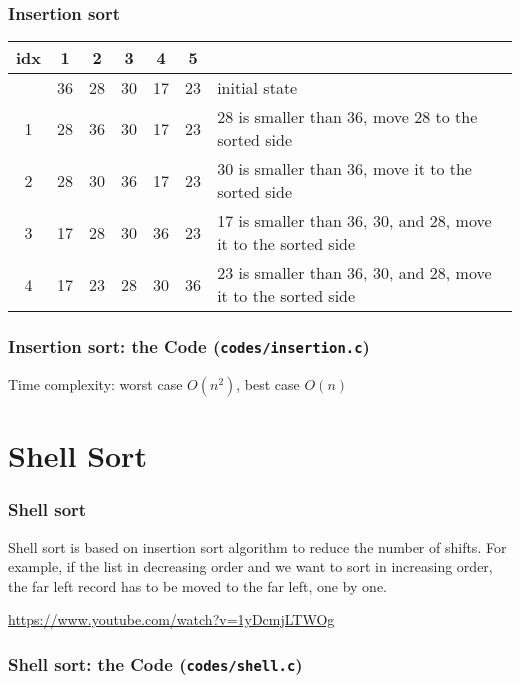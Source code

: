 \documentclass[newPxFont,sthlmFooter,nooffset]{beamer}
\begin{document}
\begin{frame}[t, fragile]
  \frametitle{Insertion sort}
\begin{tabular}{c | c | c | c | c | c | p{6.5cm}}
  idx   & 1  & 2  & 3  & 4  & 5  & ~ \\ \hline
          & 36 & 28 & 30 & 17 & 23 & initial state\\ \hline
  1       & \color{red}28 & \color{red}36 & 30 & 17 & 23 & {\footnotesize 28 is smaller than 36, move 28 to the sorted side } \pause \\  \hline
  2       & \color{red}28 & \color{red}30 & \color{red}36 & 17 & 23 & {\footnotesize 30 is smaller than 36, move it to the sorted side} \pause \\  \hline
  3       & \color{red}17 & \color{red}28 & \color{red}30 & \color{red}36 & 23 & {\footnotesize 17 is smaller than 36, 30, and 28, move it to the sorted side} \pause \\  \hline
  4       & \color{red}17 & \color{red}23 & \color{red}28 & \color{red}30 & \color{red}36 & {\footnotesize 23 is smaller than 36, 30, and 28, move it to the sorted side} 
\end{tabular}
\end{frame}


\begin{frame}[t, fragile]
  \frametitle{Insertion sort: the Code (\texttt{codes/insertion.c})}
  

Time complexity: worst case $O(n^2)$, best case $O(n)$
\end{frame}


\section{Shell Sort}
\begin{frame}[t]
  \frametitle{Shell sort}
Shell sort is based on insertion sort algorithm to reduce the number of shifts. For example, if the list in decreasing order and we want to sort in increasing order, the far left record has to be moved to the far left, one by one.

\url{https://www.youtube.com/watch?v=1yDcmjLTWOg}
\end{frame}

\begin{frame}[t, fragile]
  \frametitle{Shell sort: the Code (\texttt{codes/shell.c})}
  


\end{frame}
\end{document}
